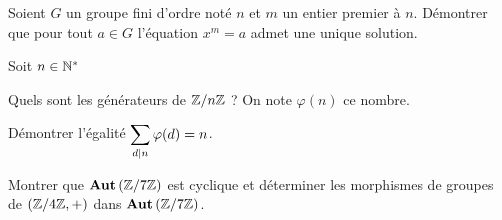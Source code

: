\documentclass{report}
\begin{document}
\begin{exo}
    Soient \(G\) un groupe fini d'ordre noté \(n\) et \(m\) un entier premier à \(n\).
    Démontrer que pour tout \(a\in G\) l'équation \(x^m=a\) admet une unique solution.
\end{exo}

\begin{exo}
    Soit \(n\in\mathbb{N}^*\)
    \begin{q}{1}
        Quels sont les générateurs de \(\mathbb{Z}/n\mathbb{Z}\) ? On note \(\varphi(n)\) ce nombre.
    \end{q}
    \begin{q}{1}
        Démontrer l'égalité \(\displaystyle\sum_{d\mid n} \varphi(d) = n\).
    \end{q}
\end{exo}

\begin{exo}
    Montrer que \(\textbf{Aut}\left(\mathbb{Z}/7\mathbb{Z}\right)\) est cyclique et déterminer
    les morphismes de groupes de \(\left(\mathbb{Z}/4\mathbb{Z},+\right)\) dans \(\textbf{Aut}\left(\mathbb{Z}/7\mathbb{Z}\right)\).
\end{exo}
\end{document}
